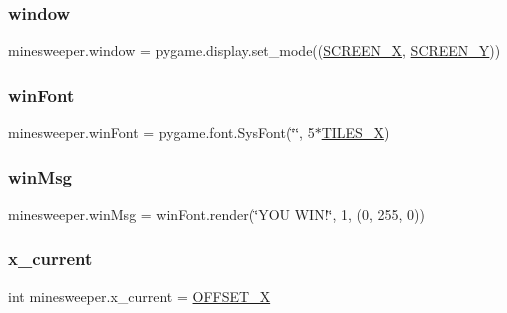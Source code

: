 \mbox{\label{namespaceminesweeper_a80cc81c5aa455fb1b4762add4b4d730c}} 
\subsubsection{\texorpdfstring{window}{window}}
{\footnotesize\ttfamily minesweeper.\+window = pygame.\+display.\+set\+\_\+mode((\mbox{\hyperlink{namespaceminesweeper_a1844cce3a8aa0b80dce337b5f39dedfb}{S\+C\+R\+E\+E\+N\+\_\+X}}, \mbox{\hyperlink{namespaceminesweeper_ab648a812026dc7c97d7267459db82451}{S\+C\+R\+E\+E\+N\+\_\+Y}}))}

\mbox{\label{namespaceminesweeper_a7f21f866eb7478d5b9b47b687f81db30}} 
\subsubsection{\texorpdfstring{winFont}{winFont}}
{\footnotesize\ttfamily minesweeper.\+win\+Font = pygame.\+font.\+Sys\+Font(\char`\"{}\char`\"{}, 5$\ast$\mbox{\hyperlink{namespaceminesweeper_ac9707e38bc10ae8def8674e284754df2}{T\+I\+L\+E\+S\+\_\+X}})}

\mbox{\label{namespaceminesweeper_a45581fb97532e945c271d97578355bec}} 
\subsubsection{\texorpdfstring{winMsg}{winMsg}}
{\footnotesize\ttfamily minesweeper.\+win\+Msg = win\+Font.\+render(\char`\"{}Y\+OU W\+I\+N!\char`\"{}, 1, (0, 255, 0))}

\mbox{\label{namespaceminesweeper_a28942e4d6e641ff5809c76fa7d9a8ac7}} 
\subsubsection{\texorpdfstring{x\_current}{x\_current}}
{\footnotesize\ttfamily int minesweeper.\+x\+\_\+current = \mbox{\hyperlink{namespaceminesweeper_a6a4ccfa26ab8b9aac5722b057e9eddbd}{O\+F\+F\+S\+E\+T\+\_\+X}}}

